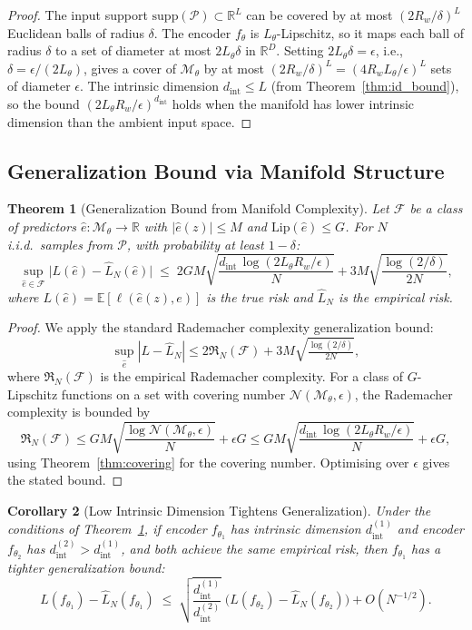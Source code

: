 \documentclass[12pt]{article}
\newtheorem{theorem}{Theorem}[section]
\newtheorem{corollary}[theorem]{Corollary}
\theoremstyle{definition}
\theoremstyle{remark}
\newcommand{\R}{\mathbb{R}}
\newcommand{\E}{\mathbb{E}}
\newcommand{\Pset}{\mathcal{P}}
\newcommand{\Fset}{\mathcal{F}}
\newcommand{\Nset}{\mathcal{N}}
\newcommand{\trm}{\mathcal{M}_\theta}
\newcommand{\dint}{d_{\mathrm{int}}}
\newcommand{\Lip}{\mathrm{Lip}}
\begin{document}
\begin{proof}
The input support $\mathrm{supp}(\Pset) \subset \R^L$ can be covered by
at most $(2R_w/\delta)^L$ Euclidean balls of radius $\delta$. The encoder
$f_\theta$ is $L_\theta$-Lipschitz, so it maps each ball of radius $\delta$
to a set of diameter at most $2L_\theta\delta$ in $\R^D$. Setting
$2L_\theta\delta = \epsilon$, i.e., $\delta = \epsilon/(2L_\theta)$, gives
a cover of $\trm$ by at most
$(2R_w/\delta)^L = (4R_w L_\theta/\epsilon)^L$ sets of diameter $\epsilon$.
The intrinsic dimension $\dint \leq L$ (from Theorem~\ref{thm:id_bound}),
so the bound $(2L_\theta R_w/\epsilon)^{\dint}$ holds when the manifold
has lower intrinsic dimension than the ambient input space.
\end{proof}

\subsection{Generalization Bound via Manifold Structure}

\begin{theorem}[Generalization Bound from Manifold Complexity]
\label{thm:gen_bound}
Let $\Fset$ be a class of predictors $\hat{e}: \trm \to \R$ with
$|\hat{e}(z)| \leq M$ and $\Lip(\hat{e}) \leq G$. For $N$ i.i.d.\ samples
from $\Pset$, with probability at least $1 - \delta$:
\[
  \sup_{\hat{e} \in \Fset}\!\bigl|L(\hat{e}) - \hat{L}_N(\hat{e})\bigr|
  \;\leq\; 2GM\sqrt{\frac{\dint\,\log(2L_\theta R_w/\epsilon)}{N}}
  + 3M\sqrt{\frac{\log(2/\delta)}{2N}},
\]
where $L(\hat{e}) = \E[\ell(\hat{e}(z), e)]$ is the true risk and
$\hat{L}_N$ is the empirical risk.
\end{theorem}

\begin{proof}
We apply the standard Rademacher complexity generalization bound:
\[
  \sup_{\hat{e}}|L - \hat{L}_N| \leq 2\mathfrak{R}_N(\Fset) + 3M\sqrt{\tfrac{\log(2/\delta)}{2N}},
\]
where $\mathfrak{R}_N(\Fset)$ is the empirical Rademacher complexity.
For a class of $G$-Lipschitz functions on a set with covering number
$\Nset(\trm, \epsilon)$, the Rademacher complexity is bounded by
\[
  \mathfrak{R}_N(\Fset)
  \leq GM\sqrt{\frac{\log \Nset(\trm, \epsilon)}{N}} + \epsilon G
  \leq GM\sqrt{\frac{\dint\,\log(2L_\theta R_w/\epsilon)}{N}} + \epsilon G,
\]
using Theorem~\ref{thm:covering} for the covering number. Optimising over
$\epsilon$ gives the stated bound.
\end{proof}

\begin{corollary}[Low Intrinsic Dimension Tightens Generalization]
\label{cor:low_id_gen}
Under the conditions of Theorem~\ref{thm:gen_bound}, if encoder $f_{\theta_1}$
has intrinsic dimension $\dint^{(1)}$ and encoder $f_{\theta_2}$ has
$\dint^{(2)} > \dint^{(1)}$, and both achieve the same empirical risk, then
$f_{\theta_1}$ has a tighter generalization bound:
\[
  L(f_{\theta_1}) - \hat{L}_N(f_{\theta_1})
  \;\leq\; \sqrt{\frac{\dint^{(1)}}{\dint^{(2)}}}\;
  \bigl(L(f_{\theta_2}) - \hat{L}_N(f_{\theta_2})\bigr) + O(N^{-1/2}).
\]
\end{corollary}
\end{document}
